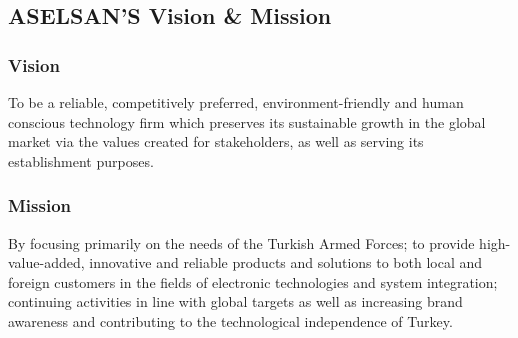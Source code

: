 \subsection{ASELSAN'S Vision \& Mission}

\subsubsection{Vision}
\- \indent

	To be a reliable, competitively preferred, environment-friendly and human conscious technology firm which preserves its sustainable growth in the global market via the values created for stakeholders, as well as serving its establishment purposes\cite{aselsan}.

\subsubsection{Mission}
\- \indent
	By focusing primarily on the needs of the Turkish Armed Forces; to provide high-value-added, innovative and reliable products and solutions to both local and foreign customers in the fields of electronic technologies and system integration; continuing activities in line with global targets as well as increasing brand awareness and contributing to the technological independence of Turkey\cite{aselsan}.

​
	
\vfill
	

